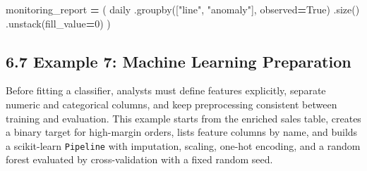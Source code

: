 \documentclass[
  12pt,
]{article}
\newenvironment{Shaded}{\begin{snugshade}}{\end{snugshade}}
\newcommand{\DecValTok}[1]{\textcolor[rgb]{0.00,0.00,0.81}{#1}}
\newcommand{\NormalTok}[1]{#1}
\newcommand{\OperatorTok}[1]{\textcolor[rgb]{0.81,0.36,0.00}{\textbf{#1}}}
\newcommand{\StringTok}[1]{\textcolor[rgb]{0.31,0.60,0.02}{#1}}
\newcommand{\VariableTok}[1]{\textcolor[rgb]{0.00,0.00,0.00}{#1}}
\begin{document}
\begin{Shaded}
\begin{Highlighting}[]
\NormalTok{monitoring\_report }\OperatorTok{=}\NormalTok{ (}
\NormalTok{    daily}
\NormalTok{    .groupby([}\StringTok{"line"}\NormalTok{, }\StringTok{"anomaly"}\NormalTok{], observed}\OperatorTok{=}\VariableTok{True}\NormalTok{)}
\NormalTok{    .size()}
\NormalTok{    .unstack(fill\_value}\OperatorTok{=}\DecValTok{0}\NormalTok{)}
\NormalTok{)}
\end{Highlighting}
\end{Shaded}

\newpage

\subsection{6.7 Example 7: Machine Learning
Preparation}\label{example-7-machine-learning-preparation}

Before fitting a classifier, analysts must define features explicitly,
separate numeric and categorical columns, and keep preprocessing
consistent between training and evaluation. This example starts from the
enriched sales table, creates a binary target for high-margin orders,
lists feature columns by name, and builds a scikit-learn
\texttt{Pipeline} with imputation, scaling, one-hot encoding, and a
random forest evaluated by cross-validation with a fixed random seed.
\end{document}
